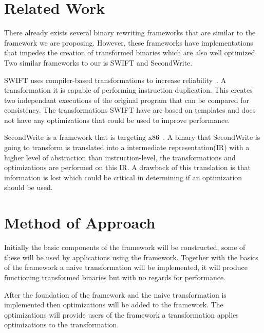 \section{Related Work}
%
There already exists several binary rewriting frameworks that are similar
to the framework we are proposing. However, these frameworks have
implementations that impedes the creation of transformed binaries
which are also well optimized. Two similar frameworks to our is SWIFT and
SecondWrite.
%

SWIFT uses compiler-based transformations to increase reliability~\cite{swift}.
A transformation it is capable of performing instruction duplication. This
creates two independant executions of the original program that can be
compared for consistency.
%
The transformations SWIFT have are based on templates and does not
have any optimizations that could be used to improve performance.
%

SecondWrite is a framework that is targeting x86~\cite{secondwrite}.
A binary that SecondWrite is going to transform
is translated into a intermediate representation(IR) with a higher
level of abstraction than instruction-level, the transformations
and optimizations are performed on this IR.
%
A drawback of this translation is that information is lost
which could be critical in determining if an optimization
should be used.
%
%


\section{Method of Approach}

Initially the basic components of the framework will be
constructed, some of these will be used by applications
using the framework. Together with the basics of the framework
a naive transformation will be implemented, it will produce
functioning transformed binaries but with no regards for performance.
%

After the foundation of the framework and the naive transformation
is implemented then optimizations will be added to the framework.
The optimizations will provide users of the framework a
transformation applies optimizations to the transformation.

